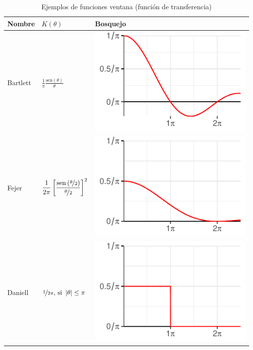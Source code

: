 \documentclass[12pt,letterpaper]{book}
\newcommand{\SEN}[1]{\mathrm{sen}\left( #1 \right)}
\newcommand{\abso}[1]{\left| #1 \right|}
\begin{document}
\begin{table}
\caption{Ejemplos de funciones ventana (función de transferencia)}
\centering
\begin{small}
\begin{tabular}{lll}
\toprule
Nombre & $K(\theta)$ & Bosquejo \\
\midrule
Bartlett &
$\displaystyle 
\frac{1}{\pi} \frac{\SEN{\theta}}{\theta}
$
& \includegraphics[scale=.4]{./img_ventanas/ventana_2_bartlett.pdf} \\
\rowcolor{gris}
Fejer &
$\displaystyle 
\frac{1}{2\pi} \left[ \frac{\SEN{\nicefrac{\theta}{2}}}{\nicefrac{\theta}{2}} \right]^{2}
$
& \includegraphics[scale=.4]{./img_ventanas/ventana_2_fejer.pdf} \\
Daniell &
$
\displaystyle 
\nicefrac{1}{2\pi} \text{, si } \abso{\theta}\leq \pi
$
& \includegraphics[scale=.4]{./img_ventanas/ventana_2_daniell.pdf} \\

\end{tabular}
\end{small}
\end{table}
\end{document}
